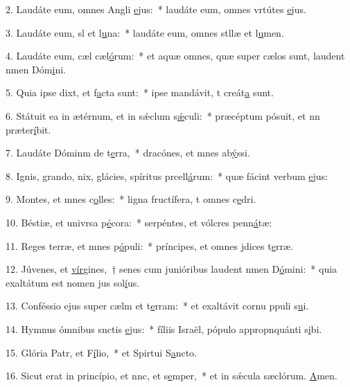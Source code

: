2. Laudáte eum, omnes Angli \uline{e}jus:~* laudáte eum, omnes vrtútes \uline{e}jus.\par 
3. Laudáte eum, sl et l\uline{u}na:~* laudáte eum, omnes stllæ et l\uline{u}men.\par 
4. Laudáte eum, cæl cæl\uline{ó}rum:~* et aquæ omnes, quæ super cælos sunt, laudent nmen Dóm\uline{i}ni.\par 
5. Quia ipse dixt, et f\uline{a}cta sunt:~* ipse mandávit, t creát\uline{a} sunt.\par 
6. Státuit ea in ætérnum, et in sǽclum s\uline{ǽ}culi:~* præcéptum pósuit, et nn præter\uline{í}bit.\par 
7. Laudáte Dóminm de t\uline{e}rra,~* dracónes, et mnes ab\uline{ý}ssi.\par 
8. Ignis, grando, nix, glácies, spíritus prcell\uline{á}rum:~* quæ fácint verbum \uline{e}jus:\par 
9. Montes, et mnes c\uline{o}lles:~* ligna fructífera, t omnes c\uline{e}dri.\par 
10. Béstiæ, et univrsa p\uline{é}cora:~* serpéntes, et vólcres penn\uline{á}tæ:\par 
11. Reges terræ, et mnes p\uline{ó}puli:~* príncipes, et omnes jdices t\uline{e}rræ.\par 
12. Júvenes, et \uline{vír}gines,~† senes cum junióribus laudent nmen D\uline{ó}mini:~* quia exaltátum est nomen jus sol\uline{í}us.\par 
13. Conféssio ejus super cælm et t\uline{e}rram:~* et exaltávit cornu ppuli s\uline{u}i.\par 
14. Hymnus ómnibus snctis \uline{e}jus:~* fíliis Israël, pópulo appropnquánti s\uline{i}bi.\par 
15. Glória Patr, et F\uline{í}lio,~* et Spirtui S\uline{a}ncto.\par 
16. Sicut erat in princípio, et nnc, et s\uline{e}mper,~* et in sǽcula sæclórum. \uline{A}men.\par 

